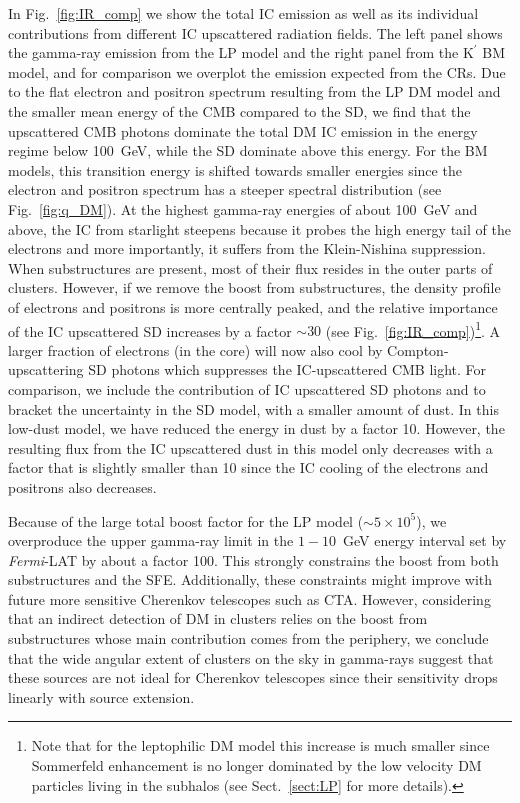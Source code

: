 \documentclass[10pt,aps,pra,reprint,amsmath,amsfonts,amssymb,showpacs,nofootinbib,floatfix]{revtex4-1}
\newcommand{\Fermi}{{\em Fermi}\xspace}
\newcommand{\rmn}{\mathrm}
\newcommand{\Kp}{\rmn{K}^\prime}
\begin{document}
In Fig.~\ref{fig:IR_comp} we show the total IC emission as well as its
individual contributions from different IC upscattered radiation
fields. The left panel shows the gamma-ray emission from the LP model
and the right panel from the $\Kp$ BM model, and for comparison we
overplot the emission expected from the CRs. Due to the flat electron
and positron spectrum resulting from the LP DM model and the smaller
mean energy of the CMB compared to the SD, we find that the
upscattered CMB photons dominate the total DM IC emission in the
energy regime below 100~GeV, while the SD dominate above this
energy. For the BM models, this transition energy is shifted towards
smaller energies since the electron and positron spectrum has a
steeper spectral distribution (see Fig.~\ref{fig:q_DM}). At the
highest gamma-ray energies of about 100~GeV and above, the IC from
starlight steepens because it probes the high energy tail of the
electrons and more importantly, it suffers from the Klein-Nishina
suppression. When substructures are present, most of their flux
resides in the outer parts of clusters. However, if we remove the
boost from substructures, the density profile of electrons and
positrons is more centrally peaked, and the relative importance of the
IC upscattered SD increases by a factor $\sim 30$ (see
Fig.~\ref{fig:IR_comp})\footnote{Note that for the leptophilic DM
  model this increase is much smaller since Sommerfeld enhancement is
  no longer dominated by the low velocity DM particles living in the
  subhalos (see Sect.~\ref{sect:LP} for more details).}.  A larger
fraction of electrons (in the core) will now also cool by
Compton-upscattering SD photons which suppresses the IC-upscattered
CMB light.  For comparison, we include the contribution of IC
upscattered SD photons and to bracket the uncertainty in the SD model,
with a smaller amount of dust. In this low-dust model, we have reduced
the energy in dust by a factor 10. However, the resulting flux from
the IC upscattered dust in this model only decreases with a factor
that is slightly smaller than 10 since the IC cooling of the electrons
and positrons also decreases.

Because of the large total boost factor for the LP model ($\sim5\times
10^5$), we overproduce the upper gamma-ray limit in the $1-10$~GeV
energy interval set by \Fermi-LAT by about a factor 100. This strongly
constrains the boost from both substructures and the
SFE. Additionally, these constraints might improve with future more
sensitive Cherenkov telescopes such as CTA. However, considering that
an indirect detection of DM in clusters relies on the boost from
substructures whose main contribution comes from the periphery, we
conclude that the wide angular extent of clusters on the sky in
gamma-rays suggest that these sources are not ideal for Cherenkov
telescopes since their sensitivity drops linearly with source
extension.
\end{document}

